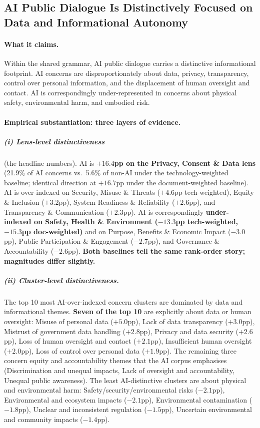 \documentclass[11pt, a4paper]{article}
\begin{document}
\subsection{AI Public Dialogue Is Distinctively Focused on Data and
Informational Autonomy}

\paragraph{What it claims.}  Within the shared grammar, AI public
dialogue carries a distinctive informational footprint.  AI concerns are
disproportionately about data, privacy, transparency, control over
personal information, and the displacement of human oversight and
contact.  AI is correspondingly under-represented in concerns about
physical safety, environmental harm, and embodied risk.

\paragraph{Empirical substantiation: three layers of evidence.}

\subparagraph{(i) Lens-level distinctiveness} (the headline numbers).
AI is \textbf{$+16.4$pp on the Privacy, Consent \& Data lens} (21.9\%
of AI concerns vs.\ 5.6\% of non-AI under the technology-weighted
baseline; identical direction at $+16.7$pp under the document-weighted
baseline).  AI is over-indexed on Security, Misuse \& Threats
($+4.6$pp tech-weighted), Equity \& Inclusion ($+3.2$pp), System
Readiness \& Reliability ($+2.6$pp), and Transparency \& Communication
($+2.3$pp).  AI is correspondingly \textbf{under-indexed on Safety,
Health \& Environment ($-13.3$pp tech-weighted, $-15.3$pp
doc-weighted)} and on Purpose, Benefits \& Economic Impact ($-3.0$pp),
Public Participation \& Engagement ($-2.7$pp), and Governance \&
Accountability ($-2.6$pp).  \textbf{Both baselines tell the same
rank-order story; magnitudes differ slightly.}

\subparagraph{(ii) Cluster-level distinctiveness.}  The top 10 most
AI-over-indexed concern clusters are dominated by data and informational
themes.  \textbf{Seven of the top 10} are explicitly about data or
human oversight: Misuse of personal data ($+5.0$pp), Lack of data
transparency ($+3.0$pp), Mistrust of government data handling
($+2.8$pp), Privacy and data security ($+2.6$pp), Loss of human
oversight and contact ($+2.1$pp), Insufficient human oversight
($+2.0$pp), Loss of control over personal data ($+1.9$pp).  The
remaining three concern equity and accountability themes that the AI
corpus emphasises (Discrimination and unequal impacts, Lack of oversight
and accountability, Unequal public awareness).  The least
AI-distinctive clusters are about physical and environmental harm:
Safety/security/environmental risks ($-2.1$pp), Environmental and
ecosystem impacts ($-2.1$pp), Environmental contamination ($-1.8$pp),
Unclear and inconsistent regulation ($-1.5$pp), Uncertain environmental
and community impacts ($-1.4$pp).
\end{document}
